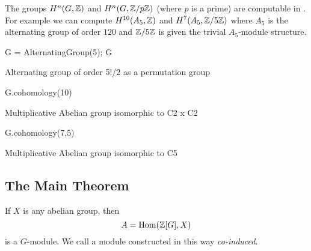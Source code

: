 \begin{example}
	The groups $H^n(G,\mathbb{Z})$ and $H^n(G,\mathbb{Z}/p\mathbb{Z})$ (where $p$ is a prime)
	are computable in \sage. For example we can compute $H^{10}(A_5,\mathbb{Z})$
	and $H^{7}(A_5,\mathbb{Z}/5\mathbb{Z})$ where $A_5$ is the alternating group of
	order $120$ and $\mathbb{Z}/5\mathbb{Z}$ is given the trivial $A_5$-module structure.
\begin{sagecode}
\begin{sagecell}
G = AlternatingGroup(5); G
\end{sagecell}
\begin{sageout}
Alternating group of order 5!/2 as a permutation group
\end{sageout}
\begin{sagecell}
G.cohomology(10)
\end{sagecell}
\begin{sageout}
Multiplicative Abelian group isomorphic to C2 x C2
\end{sageout}
\begin{sagecell}
G.cohomology(7,5)
\end{sagecell}
\begin{sageout}
Multiplicative Abelian group isomorphic to C5
\end{sageout}
\end{sagecode}
\end{example}

\subsection{The Main Theorem}

\begin{definition}
	If $X$ is any abelian group, then
	$$
		A = \operatorname{Hom}(\mathbb{Z}[G], X)
	$$
	is a $G$-module. We call a module constructed in this
	way \emph{co-induced}.
\end{definition}

